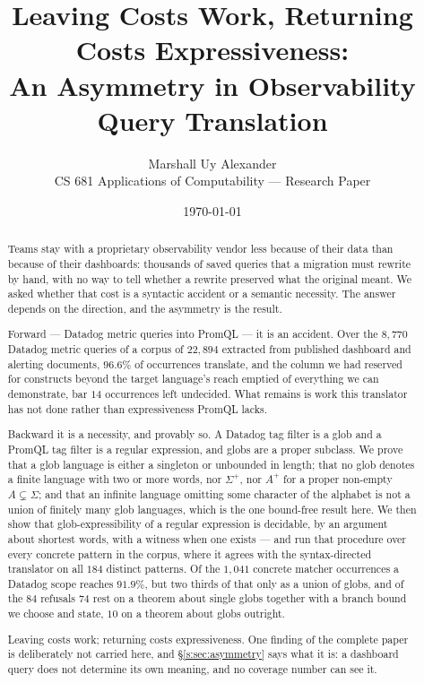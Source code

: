 \title{\textbf{Leaving Costs Work, Returning Costs Expressiveness:}\\
\Large An Asymmetry in Observability Query Translation}
\author{Marshall Uy Alexander\\ \small CS 681 Applications of Computability --- Research Paper}
\date{\small \today}


\maketitle

\begin{abstract}\noindent
Teams stay with a proprietary observability vendor less because of their data than
because of their dashboards: thousands of saved queries that a migration must rewrite by
hand, with no way to tell whether a rewrite preserved what the original meant. We asked
whether that cost is a syntactic accident or a semantic necessity. The answer depends on
the direction, and the asymmetry is the result.

Forward --- Datadog metric queries into PromQL --- it is an accident. Over the $8{,}770$
Datadog metric queries of a corpus of $22{,}894$ extracted from published dashboard and
alerting documents, $96.6\%$ of occurrences translate, and the column we had reserved for
constructs beyond the target language's reach emptied of everything we can demonstrate,
bar $14$ occurrences left undecided. What remains is work this translator has not done
rather than expressiveness PromQL lacks.

Backward it is a necessity, and provably so. A Datadog tag filter is a glob and a PromQL
tag filter is a regular expression, and globs are a proper subclass. We prove that a glob
language is either a singleton or unbounded in length; that no glob denotes a finite
language with two or more words, nor $\Sigma^{+}$, nor $A^{+}$ for a proper non-empty
$A\subsetneq\Sigma$; and that an infinite language omitting some character of the
alphabet is not a union of finitely many glob languages, which is the one bound-free
result here. We then show that glob-expressibility of a regular expression is decidable,
by an argument about shortest words, with a witness when one exists --- and run that
procedure over every concrete pattern in the corpus, where it agrees with the
syntax-directed translator on all $184$ distinct patterns. Of the $1{,}041$ concrete
matcher occurrences a Datadog scope reaches $91.9\%$, but two thirds of that only as a
union of globs, and of the $84$ refusals $74$ rest on a theorem about single globs
together with a branch bound we choose and state, $10$ on a theorem about globs outright.

Leaving costs work; returning costs expressiveness. One finding of the complete paper is
deliberately not carried here, and \S\ref{s:sec:asymmetry} says what it is: a dashboard
query does not determine its own meaning, and no coverage number can see it.
\end{abstract}









\small

